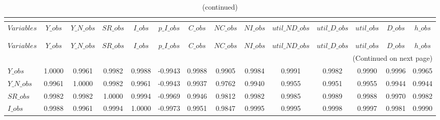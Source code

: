  
\begin{center}
\begin{longtable}{lccccccccccccc} 
\caption{MATRIX OF CORRELATIONS}\\
 \label{Table:th_corr_matrix}\\
\toprule 
$Variables      $	 & 	 $          Y\_obs$	 & 	 $      Y\_N\_obs$	 & 	 $         SR\_obs$	 & 	 $          I\_obs$	 & 	 $      p\_I\_obs$	 & 	 $          C\_obs$	 & 	 $         NC\_obs$	 & 	 $         NI\_obs$	 & 	 $  util\_ND\_obs$	 & 	 $   util\_D\_obs$	 & 	 $       util\_obs$	 & 	 $          D\_obs$	 & 	 $          h\_obs$\\
\midrule \endfirsthead 
\caption{(continued)}\\
 \toprule \\ 
$Variables      $	 & 	 $          Y\_obs$	 & 	 $      Y\_N\_obs$	 & 	 $         SR\_obs$	 & 	 $          I\_obs$	 & 	 $      p\_I\_obs$	 & 	 $          C\_obs$	 & 	 $         NC\_obs$	 & 	 $         NI\_obs$	 & 	 $  util\_ND\_obs$	 & 	 $   util\_D\_obs$	 & 	 $       util\_obs$	 & 	 $          D\_obs$	 & 	 $          h\_obs$\\
\midrule \endhead 
\midrule \multicolumn{14}{r}{(Continued on next page)} \\ \bottomrule \endfoot 
\bottomrule \endlastfoot 
$Y\_obs         $	 & 	           1.0000	 & 	           0.9961	 & 	           0.9982	 & 	           0.9988	 & 	          -0.9943	 & 	           0.9988	 & 	           0.9905	 & 	           0.9984	 & 	           0.9991	 & 	           0.9982	 & 	           0.9990	 & 	           0.9996	 & 	           0.9965 \\ 
$Y\_N\_obs      $	 & 	           0.9961	 & 	           1.0000	 & 	           0.9982	 & 	           0.9961	 & 	          -0.9943	 & 	           0.9937	 & 	           0.9762	 & 	           0.9940	 & 	           0.9955	 & 	           0.9951	 & 	           0.9955	 & 	           0.9944	 & 	           0.9944 \\ 
$SR\_obs        $	 & 	           0.9982	 & 	           0.9982	 & 	           1.0000	 & 	           0.9994	 & 	          -0.9969	 & 	           0.9946	 & 	           0.9812	 & 	           0.9982	 & 	           0.9985	 & 	           0.9989	 & 	           0.9988	 & 	           0.9970	 & 	           0.9982 \\ 
$I\_obs         $	 & 	           0.9988	 & 	           0.9961	 & 	           0.9994	 & 	           1.0000	 & 	          -0.9973	 & 	           0.9951	 & 	           0.9847	 & 	           0.9995	 & 	           0.9995	 & 	           0.9998	 & 	           0.9997	 & 	           0.9981	 & 	           0.9990 \\ 

\end{longtable}
\end{center}
